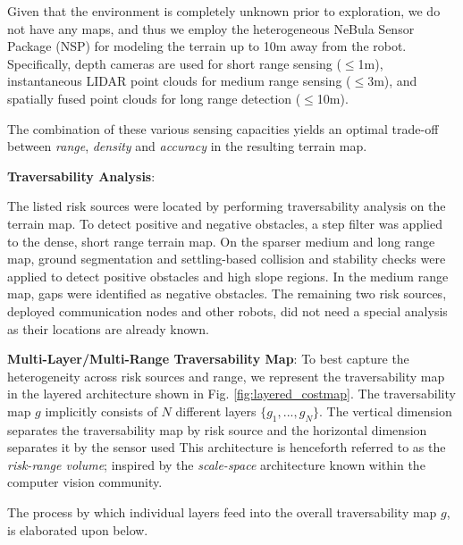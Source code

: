 \documentclass[letterpaper, 10pt, conference]{ieeeconf}      %
\newcommand{\ph}[1]{{\textbf{#1}:}} %
\newcommand{\rev}[1]{{\color{blue} #1 }} %
\begin{document}
\rev{Given that the environment is completely unknown prior to exploration, we do not have any maps, and thus}we employ the heterogeneous NeBula Sensor Package (NSP) for modeling the terrain up to 10m away from the robot.
Specifically, depth cameras are used for short range sensing ($\leq$1m), instantaneous LIDAR point clouds for medium range sensing ($\leq$3m), and spatially fused point clouds \cite{oleynikova2017voxblox} for long range detection ($\leq$10m).

\rev{The combination of these various sensing capacities yields an optimal}trade-off between \emph{range}, \emph{density} and \emph{accuracy} in the resulting terrain map.

\rev{\ph{Traversability Analysis}}

The listed risk sources were located by performing traversability analysis on the terrain map.
To detect positive and negative obstacles, a step filter was applied to the dense, short range terrain map. 
On the sparser medium and long range map, ground segmentation \cite{himmelsbach2010fast} and settling-based collision and stability checks \cite{krusi2017driving} were applied to detect positive obstacles and high slope regions.
In the medium range map, gaps were identified as negative obstacles.
The remaining two risk sources, deployed communication nodes and other robots, did not need a special analysis as their locations are already known.


\rev{\ph{Multi-Layer/Multi-Range Traversability Map}}
To best capture the heterogeneity across risk sources and range, we represent the traversability map in the layered architecture shown in Fig. \ref{fig:layered_costmap}.
The traversability map $g$ implicitly consists of $N$ different layers $\{g_1,...,g_N\}$. The vertical dimension separates the traversability map by risk source and the horizontal dimension separates it by the sensor used
This architecture is henceforth referred to as the \emph{risk-range volume}; inspired by the  
\emph{scale-space} architecture known within the computer vision community.

The process by which individual layers feed into the overall traversability map $g$, is elaborated upon below.
\end{document}
